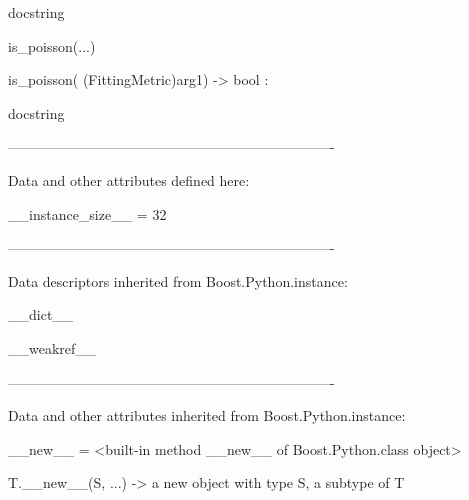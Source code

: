 \documentclass[letterpaper,10pt,english]{sphinxmanual}
\begin{document}
\begin{description}
\begin{description}
\begin{DUlineblock}{0em}
\begin{DUlineblock}{\DUlineblockindent}
\begin{DUlineblock}{\DUlineblockindent}
\item[] docstring
\item[] 
\end{DUlineblock}
\end{DUlineblock}
\item[] is\_poisson(...)
\item[]
\begin{DUlineblock}{\DUlineblockindent}
\item[] is\_poisson( (FittingMetric)arg1) -\textgreater{} bool :
\item[]
\begin{DUlineblock}{\DUlineblockindent}
\item[] docstring
\item[] 
\end{DUlineblock}
\end{DUlineblock}
\item[] ----------------------------------------------------------------------
\item[] Data and other attributes defined here:
\item[] 
\item[] \_\_instance\_size\_\_ = 32
\item[] 
\item[] ----------------------------------------------------------------------
\item[] Data descriptors inherited from Boost.Python.instance:
\item[] 
\item[] \_\_dict\_\_
\item[] 
\item[] \_\_weakref\_\_
\item[] 
\item[] ----------------------------------------------------------------------
\item[] Data and other attributes inherited from Boost.Python.instance:
\item[] 
\item[] \_\_new\_\_ = \textless{}built-in method \_\_new\_\_ of Boost.Python.class object\textgreater{}
\item[]
\begin{DUlineblock}{\DUlineblockindent}
\item[] T.\_\_new\_\_(S, ...) -\textgreater{} a new object with type S, a subtype of T
\end{DUlineblock}
\end{DUlineblock}


\end{description}
\end{description}
\end{document}
